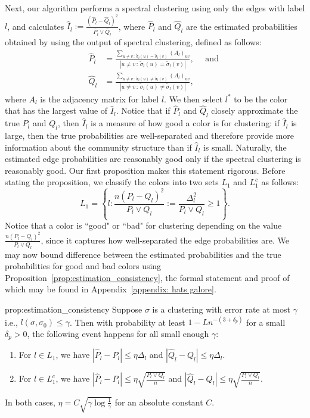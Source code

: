 \documentclass{article}
\begin{document}
Next, our algorithm performs a spectral clustering using only the edges with label $l$, and calculates $\hat I_l := \frac{(\hat P_l - \hat Q_l)^2}{\hat P_l \vee \hat Q_l}$, where $\hat P_l$ and $\hat Q_l$ are the estimated probabilities obtained by using the output of spectral clustering, defined as follows: 
\begin{align*}
\hat P_l &= \frac{ \sum_{u \neq v \,:\, \tilde{\sigma}_l(u) = \tilde{\sigma}_l(v) } (A_l)_{uv} }{ |{u \neq v \,:\, \tilde{\sigma}_l(u) = \tilde{\sigma}_l(v) }| }, \quad\text{ and }\\
\hat{Q}_l &=  \frac{ \sum_{u \neq v \,:\, \tilde{\sigma}_l(u) \neq \tilde{\sigma}_l(v) } (A_l)_{uv} }{ |{u \neq v \,:\, \tilde{\sigma}_l(u) \neq \tilde{\sigma}_l(v) }| },
\end{align*}
where $A_l$ is the adjacency matrix for label $l$. We then select $l^*$ to be the color that has the largest value of $\hat I_l$. Notice that if $\hat P_l$ and $\hat Q_l$ closely approximate the true $P_l$ and $Q_l$, then $\hat I_l$ is a measure of how good a color is for clustering: if $\hat I_l$ is large, then the true probabilities are well-separated and therefore provide more information about the community structure than if $\hat I_l$ is small. Naturally, the estimated edge probabilities are reasonably good only if the spectral clustering is reasonably good. Our first proposition makes this statement rigorous. Before stating the proposition, we classify the colors into two sets $L_1$ and $L_1^c$ as follows:
$$L_1 = \left\{ l : \frac{n(P_l-Q_l)^2}{P_l \vee Q_l} := \frac{\Delta_l^2}{P_l \vee Q_l} \geq 1 \right\}.$$
Notice that  a color is ``good" or ``bad" for clustering depending on the value $\frac{n(P_l-Q_l)^2}{P_l \vee Q_l}$, since it captures how well-separated the edge probabilities are. We may now bound difference between the estimated probabilities and the true probabilities for good and bad colors using Proposition~\ref{prop:estimation_consistency}, the formal statement and proof of which may be found in Appendix~\ref{appendix: hats galore}.
\begin{repproposition}{prop:estimation_consistency}
Suppose $\sigma$ is a clustering with error rate at most $\gamma$ i.e., $l(\sigma, \sigma_0) \leq \gamma $. Then with probability at least $1 - L n^{-(3 + \delta_p)}$ for a small $\delta_p > 0$, the following event happens for all small enough $\gamma$:
\begin{enumerate}
\item For $l \in L_1$, we have $| \hat{P}_l - P_l | \leq \eta \Delta_l$ and $| \hat{Q}_l - Q_l | \leq \eta \Delta_l.$
\item For $l \in L_1^c$, we have $| \hat{P}_l - P_l | \leq \eta \sqrt{ \frac{P_l \vee Q_l}{n}}$ and $| \hat{Q}_l - Q_l | \leq \eta \sqrt{ \frac{P_l \vee Q_l}{n}}$.
\end{enumerate}
In both cases,  $\eta = C \sqrt{\gamma \log \frac{1}{\gamma}}$ for an absolute constant $C$.
\end{repproposition}
\end{document}
